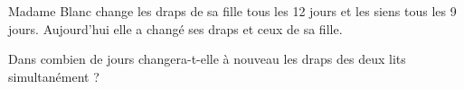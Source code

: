 
Madame Blanc change les draps de sa fille tous les 12 jours et les siens tous les 9 jours. Aujourd'hui elle a changé ses draps et ceux de sa fille.

Dans combien de jours changera-t-elle à nouveau les draps des deux lits simultanément ?